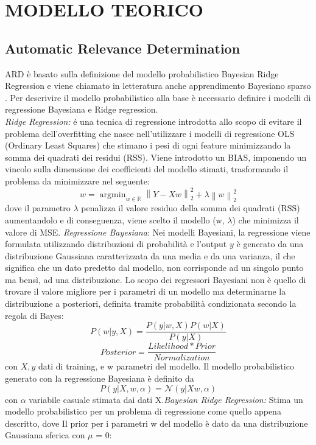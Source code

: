 \documentclass[10pt,journal,compsoc]{IEEEtran}
\DeclareMathOperator*{\argmin}{argmin}
\newcommand{\norm}[1]{\left\lVert#1\right\rVert}
\begin{document}
\section{MODELLO TEORICO}\label{sec:modello}
\subsection{Automatic Relevance Determination}
ARD è basato sulla definizione del modello probabilistico Bayesian Ridge Regression e viene chiamato in letteratura anche apprendimento Bayesiano sparso \cite{ardimp}. Per descrivire il modello probabilistico alla base è necessario definire  i modelli di regressione Bayesiana e Ridge regression. \\
\emph{Ridge Regression:}
é una tecnica di regressione introdotta allo scopo di evitare il problema dell'overfitting che nasce nell'utilizzare i modelli di regressione OLS (Ordinary Least Squares) che stimano i pesi di ogni feature minimizzando la somma dei quadrati dei residui (RSS). Viene introdotto un BIAS, imponendo un vincolo sulla dimensione dei coefficienti del modello stimati, trasformando il problema da minimizzare nel seguente:\\
\[w = \argmin_{w \in \mathbb{R}} \norm{Y-Xw}_2^2 + \lambda \norm{w}_2^2 \tag{1}\]
dove il parametro \(\lambda\) penalizza il valore residuo della somma dei quadrati (RSS) aumentandolo e di conseguenza, viene scelto il modello (w, \(\lambda\)) che minimizza il valore di MSE.
\emph{Regressione Bayesiana}: Nei modelli Bayesiani, la regressione viene formulata utilizzando distribuzioni di probabilità e l'output  \(y\) è generato da una distribuzione Gaussiana caratterizzata da una media e da una varianza, il che significa che un dato predetto dal modello, non corrisponde ad un singolo punto ma bensì, ad una distribuzione. Lo scopo dei regressori Bayesiani non è quello di trovare il valore migliore per i parametri di un modello ma  determinarne la distribuzione a posteriori, definita tramite probabilità condizionata secondo la regola di Bayes:
\[P(w|y,X) = \frac{P(y|w,X)P(w|X)}{P(y|X)} \tag{2} \] 
\[Posterior = \frac{Likelihood * Prior}{Normalization} \tag{3}\]
con \(X,y\) dati di training, e w parametri del modello.
Il modello probabilistico generato con la regressione Bayesiana è definito da
\[P(y|X,w,\alpha) = \mathcal{N}(y|Xw,\alpha) \tag{4}\]
con \(\alpha\) variabile casuale stimata dai dati X.\newpage\emph{Bayesian Ridge Regression:} Stima un modello probabilistico per un problema di regressione come quello appena descritto, dove Il prior per i parametri w del modello è dato da una distribuzione Gaussiana sferica con \(\mu\) = 0:
\end{document}

